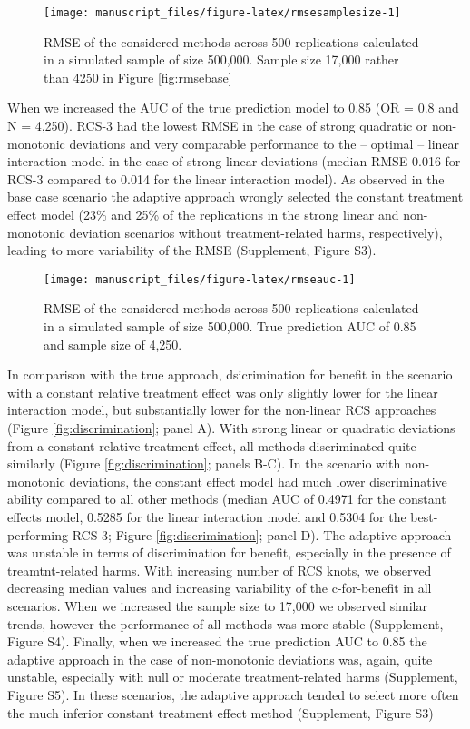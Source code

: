 \documentclass[]{elsarticle} %
\begin{document}
\begin{figure}
\texttt{[image: manuscript\_files/figure-latex/rmsesamplesize-1]} \caption{RMSE of the considered methods across 500 replications calculated in a simulated sample of size 500,000. Sample size 17,000 rather than 4250 in Figure \ref{fig:rmsebase}}\label{fig:rmsesamplesize}
\end{figure}

When we increased the AUC of the true prediction model to 0.85 (OR = 0.8
and N = 4,250). RCS-3 had the lowest RMSE in the case of strong
quadratic or non-monotonic deviations and very comparable performance to
the -- optimal -- linear interaction model in the case of strong linear
deviations (median RMSE 0.016 for RCS-3 compared to 0.014 for the linear
interaction model). As observed in the base case scenario the adaptive
approach wrongly selected the constant treatment effect model (23\% and
25\% of the replications in the strong linear and non-monotonic
deviation scenarios without treatment-related harms, respectively),
leading to more variability of the RMSE (Supplement, Figure S3).

\begin{figure}
\texttt{[image: manuscript\_files/figure-latex/rmseauc-1]} \caption{RMSE of the considered methods across 500 replications calculated in a simulated sample of size 500,000. True prediction AUC of 0.85 and sample size of 4,250.}\label{fig:rmseauc}
\end{figure}

In comparison with the true approach, dsicrimination for benefit in the
scenario with a constant relative treatment effect was only slightly
lower for the linear interaction model, but substantially lower for the
non-linear RCS approaches (Figure \ref{fig:discrimination}; panel A).
With strong linear or quadratic deviations from a constant relative
treatment effect, all methods discriminated quite similarly (Figure
\ref{fig:discrimination}; panels B-C). In the scenario with
non-monotonic deviations, the constant effect model had much lower
discriminative ability compared to all other methods (median AUC of
0.4971 for the constant effects model, 0.5285 for the linear interaction
model and 0.5304 for the best-performing RCS-3; Figure
\ref{fig:discrimination}; panel D). The adaptive approach was unstable
in terms of discrimination for benefit, especially in the presence of
treamtnt-related harms. With increasing number of RCS knots, we observed
decreasing median values and increasing variability of the c-for-benefit
in all scenarios. When we increased the sample size to 17,000 we
observed similar trends, however the performance of all methods was more
stable (Supplement, Figure S4). Finally, when we increased the true
prediction AUC to 0.85 the adaptive approach in the case of
non-monotonic deviations was, again, quite unstable, especially with
null or moderate treatment-related harms (Supplement, Figure S5). In
these scenarios, the adaptive approach tended to select more often the
much inferior constant treatment effect method (Supplement, Figure S3)
\end{document}
